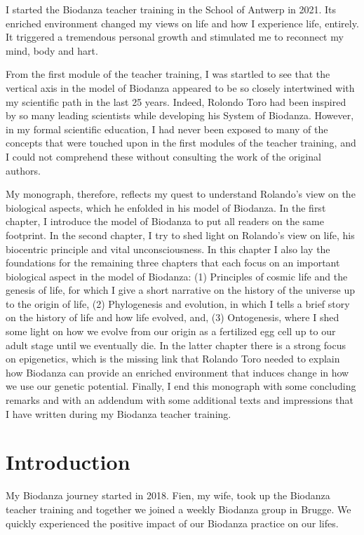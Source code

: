 \documentclass[
  11pt,
]{book}
\begin{document}
I started the Biodanza teacher training in the School of Antwerp in 2021. Its enriched environment changed my views on life and how I experience life, entirely. It triggered a tremendous personal growth and stimulated me to reconnect my mind, body and hart.

From the first module of the teacher training, I was startled to see that the vertical axis in the model of Biodanza appeared to be so closely intertwined with my scientific path in the last 25 years. Indeed, Rolondo Toro had been inspired by so many leading scientists while developing his System of Biodanza. However, in my formal scientific education, I had never been exposed to many of the concepts that were touched upon in the first modules of the teacher training, and I could not comprehend these without consulting the work of the original authors.

My monograph, therefore, reflects my quest to understand Rolando's view on the biological aspects, which he enfolded in his model of Biodanza. In the first chapter, I introduce the model of Biodanza to put all readers on the same footprint. In the second chapter, I try to shed light on Rolando's view on life, his biocentric principle and vital unconsciousness. In this chapter I also lay the foundations for the remaining three chapters that each focus on an important biological aspect in the model of Biodanza: (1) Principles of cosmic life and the genesis of life, for which I give a short narrative on the history of the universe up to the origin of life, (2) Phylogenesis and evolution, in which I tells a brief story on the history of life and how life evolved, and, (3) Ontogenesis, where I shed some light on how we evolve from our origin as a fertilized egg cell up to our adult stage until we eventually die. In the latter chapter there is a strong focus on epigenetics, which is the missing link that Rolando Toro needed to explain how Biodanza can provide an enriched environment that induces change in how we use our genetic potential. Finally, I end this monograph with some concluding remarks and with an addendum with some additional texts and impressions that I have written during my Biodanza teacher training.

\hypertarget{intro}{%
\chapter{Introduction}\label{intro}}

My Biodanza journey started in 2018. Fien, my wife, took up the Biodanza teacher training and together we joined a weekly Biodanza group in Brugge. We quickly experienced the positive impact of our Biodanza practice on our lifes.
\end{document}
